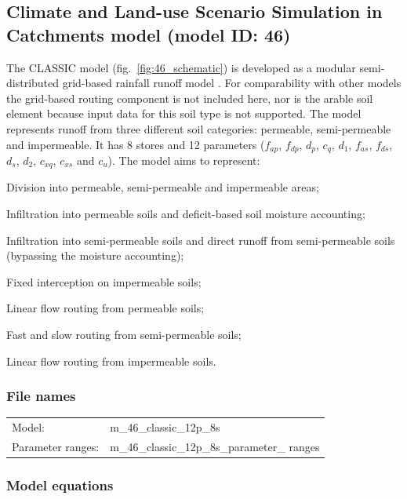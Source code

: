 \subsection{Climate and Land-use Scenario Simulation in Catchments model (model ID: 46)}
The CLASSIC model (fig.~\ref{fig:46_schematic}) is developed as a modular semi-distributed grid-based rainfall runoff model \citep{Crooks2007}. For comparability with other models the grid-based routing component is not included here, nor is the arable soil element because input data for this soil type is not supported. The model represents runoff from three different soil categories: permeable, semi-permeable and impermeable. It has 8 stores and 12 parameters ($f_{ap}$, $f_{dp}$, $d_p$, $c_q$, $d_1$, $f_{as}$, $f_{ds}$, $d_s$, $d_2$, $c_{xq}$, $c_{xs}$ and $c_{u}$). The model aims to represent:

\begin{itemizecompact}
\item Division into permeable, semi-permeable and impermeable areas;
\item Infiltration into permeable soils and deficit-based soil moisture accounting;
\item Infiltration into semi-permeable soils and direct runoff from semi-permeable soils (bypassing the moisture accounting);
\item Fixed interception on impermeable soils;
\item Linear flow routing from permeable soils;
\item Fast and slow routing from semi-permeable soils;
\item Linear flow routing from impermeable soils.
\end{itemizecompact}

\subsubsection{File names}
\begin{tabular}{@{}ll}
Model: &m\_46\_classic\_12p\_8s \\
Parameter ranges: &m\_46\_classic\_12p\_8s\_parameter\_ ranges \\
\end{tabular}

\subsubsection{Model equations}

